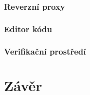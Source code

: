 \subsection{Reverzní proxy}

\subsection{Editor kódu}

\subsection{Verifikační prostředí}

\chapter*{Závěr}

